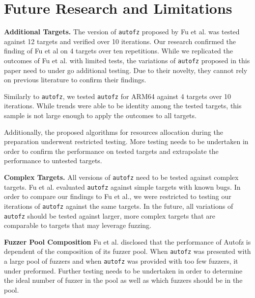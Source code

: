 \section{Future Research and Limitations}
\item \textbf{Additional Targets.} The version of \texttt{autofz} proposed by Fu et al. 
was tested against 12 targets and verified over 10 iterations. Our research  
confirmed the finding of Fu et al on 4 targets over ten repetitions. While we 
replicated the outcomes of Fu et al. with limited tests, the variations 
of \texttt{autofz} proposed in this paper need to under go additional testing. Due to their 
novelty, they cannot rely on previous literature to confirm their findings.

Similarly to \texttt{autofz}, we tested \texttt{autofz} for ARM64 against 4 targets over 10 
iterations. While trends were able to be identity among the tested targets, this
sample is not large enough to apply the outcomes to all targets. 

Additionally, the proposed algorithms for resources allocation during the preparation
underwent restricted testing. More testing needs to be undertaken in order to confirm
the performance on tested targets and extrapolate the performance to untested targets.

\item \textbf{Complex Targets.} All versions of \texttt{autofz} need to be tested against 
complex targets. Fu et al. evaluated \texttt{autofz} against simple targets with known bugs. In 
order to compare our findings to Fu et al., we were restricted to testing our 
iterations of \texttt{autofz} against the same targets. In the future, all variations of 
\texttt{autofz} should be tested against larger, more complex targets that are comparable to
targets that may leverage fuzzing.

\item \textbf{Fuzzer Pool Composition} Fu et al. disclosed that the performance of
Autofz is dependent of the composition of its fuzzer pool. When \texttt{autofz} was presented
with a large pool of fuzzers and when \texttt{autofz} was provided with too few fuzzers, it 
under preformed. Further testing needs to be undertaken in order to determine the ideal
number of fuzzer in the pool as well as which fuzzers should be in the pool.